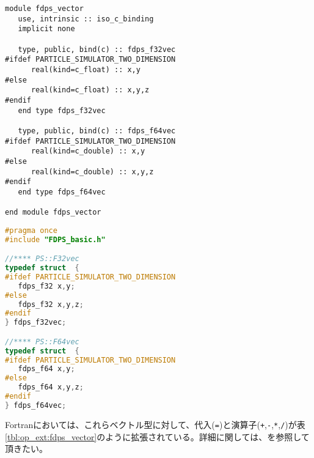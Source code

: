 \begin{lstlisting}[caption=ベクトル型 (Fortran)]
module fdps_vector
   use, intrinsic :: iso_c_binding
   implicit none
   
   type, public, bind(c) :: fdps_f32vec
#ifdef PARTICLE_SIMULATOR_TWO_DIMENSION 
      real(kind=c_float) :: x,y
#else
      real(kind=c_float) :: x,y,z
#endif
   end type fdps_f32vec

   type, public, bind(c) :: fdps_f64vec
#ifdef PARTICLE_SIMULATOR_TWO_DIMENSION 
      real(kind=c_double) :: x,y
#else
      real(kind=c_double) :: x,y,z
#endif
   end type fdps_f64vec

end module fdps_vector
\end{lstlisting}

\begin{lstlisting}[language=C,caption=ベクトル型 (C言語)]
#pragma once
#include "FDPS_basic.h"

//**** PS::F32vec
typedef struct  {
#ifdef PARTICLE_SIMULATOR_TWO_DIMENSION
   fdps_f32 x,y;
#else
   fdps_f32 x,y,z;
#endif
} fdps_f32vec;

//**** PS::F64vec
typedef struct  {
#ifdef PARTICLE_SIMULATOR_TWO_DIMENSION
   fdps_f64 x,y;
#else
   fdps_f64 x,y,z;
#endif
} fdps_f64vec;
\end{lstlisting}

Fortranにおいては、これらベクトル型に対して、代入(\texttt{=})と演算子(\texttt{+},\texttt{-},\texttt{*},\texttt{/})が表\ref{tbl:op_ext:fdps_vector}のように拡張されている。詳細に関しては、を参照して頂きたい。

